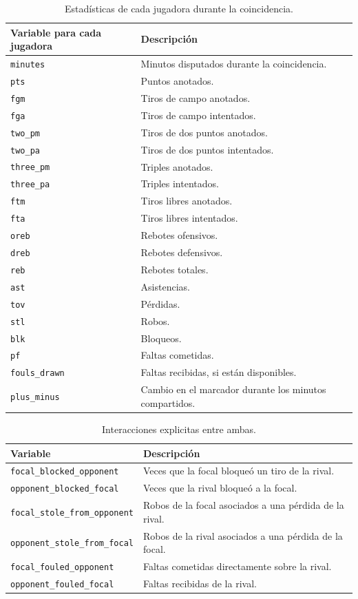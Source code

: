 \begin{longtable}{@{}p{4.5cm}p{8.2cm}@{}}
\caption{Estadísticas de cada jugadora durante la coincidencia.}\\
\toprule\textbf{Variable para cada jugadora}&\textbf{Descripción}\\\midrule\endhead
\texttt{minutes}&Minutos disputados durante la coincidencia.\\
\texttt{pts}&Puntos anotados.\\
\texttt{fgm}&Tiros de campo anotados.\\
\texttt{fga}&Tiros de campo intentados.\\
\texttt{two\_pm}&Tiros de dos puntos anotados.\\
\texttt{two\_pa}&Tiros de dos puntos intentados.\\
\texttt{three\_pm}&Triples anotados.\\
\texttt{three\_pa}&Triples intentados.\\
\texttt{ftm}&Tiros libres anotados.\\
\texttt{fta}&Tiros libres intentados.\\
\texttt{oreb}&Rebotes ofensivos.\\
\texttt{dreb}&Rebotes defensivos.\\
\texttt{reb}&Rebotes totales.\\
\texttt{ast}&Asistencias.\\
\texttt{tov}&Pérdidas.\\
\texttt{stl}&Robos.\\
\texttt{blk}&Bloqueos.\\
\texttt{pf}&Faltas cometidas.\\
\texttt{fouls\_drawn}&Faltas recibidas, si están disponibles.\\
\texttt{plus\_minus}&Cambio en el marcador durante los minutos compartidos.\\
\bottomrule
\end{longtable}

\begin{longtable}{@{}p{5.5cm}p{7.2cm}@{}}
\caption{Interacciones explicitas entre ambas.}\\
\toprule\textbf{Variable}&\textbf{Descripción}\\\midrule\endhead
\texttt{focal\_blocked\_opponent}&Veces que la focal bloqueó un tiro de la rival.\\
\texttt{opponent\_blocked\_focal}&Veces que la rival bloqueó a la focal.\\
\texttt{focal\_stole\_from\_opponent}&Robos de la focal asociados a una pérdida de la rival.\\
\texttt{opponent\_stole\_from\_focal}&Robos de la rival asociados a una pérdida de la focal.\\
\texttt{focal\_fouled\_opponent}&Faltas cometidas directamente sobre la rival.\\
\texttt{opponent\_fouled\_focal}&Faltas recibidas de la rival.\\
\bottomrule
\end{longtable}
